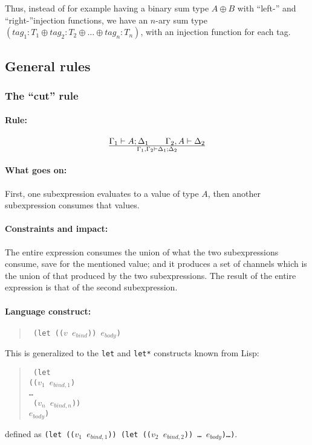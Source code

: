 \documentclass[a4paper]{article}
\begin{document}
Thus, instead of for example having a binary sum type $A \oplus B$
with ``left-'' and ``right-''injection functions, we have an $n$-ary
sum type $(\mathit{tag}_1:T_1 \oplus \mathit{tag}_2:T_2 \oplus \ldots
\oplus \mathit{tag}_n:T_n)$, with an injection function for each tag.


\subsection{General rules}

\subsubsection{The ``cut'' rule}
\paragraph{Rule:}
$$
{
  \Gamma_1 \vdash A; \Delta_1
  \qquad
  \Gamma_2,A \vdash \Delta_2
}\over{
  \Gamma_1, \Gamma_2 \vdash \Delta_1; \Delta_2
}
$$

\paragraph{What goes on:} First, one subexpression evaluates to a
value of type $A$, then another subexpression consumes that values.

\paragraph{Constraints and impact:} The entire expression consumes the
union of what the two subexpressions consume, save for the mentioned
value; and it produces a set of channels which is the union of that
produced by the two subexpressions. The result of the entire
expression is that of the second subexpression.

\paragraph{Language construct:}
\begin{quote}\tt
(let (($v$ $e_{bind}$)) $e_{body}$)
\end{quote}
This is generalized to the \texttt{let} and \texttt{let*} constructs
known from Lisp:
\begin{quote}\tt
(let\\
  \phantom{ }\quad (($v_1$ $e_{bind,1}$)\\
  \phantom{ }\quad \ldots\\
  \phantom{ }\quad\ ($v_n$ $e_{bind,n}$))\\
  \phantom{ }\quad $e_{body}$)
\end{quote}
defined as \texttt{(let (($v_1$ $e_{bind,1}$)) (let (($v_2$ $e_{bind,2}$)) \ldots\ $e_{body}$)\ldots)}.
\end{document}
